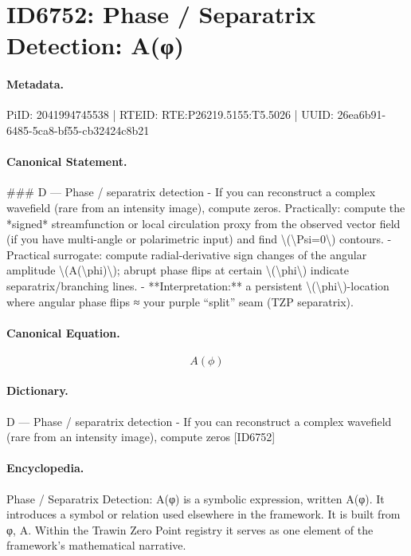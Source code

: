 \section*{ID6752: Phase / Separatrix Detection: A(φ)}
\paragraph{Metadata.}
PiID: 2041994745538 | RTEID: RTE:P26219.5155:T5.5026 | UUID: 26ea6b91-6485-5ca8-bf55-cb32424c8b21

\paragraph{Canonical Statement.}
\#\#\# D — Phase / separatrix detection - If you can reconstruct a complex wavefield (rare from an intensity image), compute zeros. Practically: compute the *signed* streamfunction or local circulation proxy from the observed vector field (if you have multi-angle or polarimetric input) and find \textbackslash{}(\textbackslash{}Psi=0\textbackslash{}) contours. - Practical surrogate: compute radial-derivative sign changes of the angular amplitude \textbackslash{}(A(\textbackslash{}phi)\textbackslash{}); abrupt phase flips at certain \textbackslash{}(\textbackslash{}phi\textbackslash{}) indicate separatrix/branching lines. - **Interpretation:** a persistent \textbackslash{}(\textbackslash{}phi\textbackslash{})-location where angular phase flips ≈ your purple “split” seam (TZP separatrix).

\paragraph{Canonical Equation.}
\[
A(\phi)
\]

\paragraph{Dictionary.}
D — Phase / separatrix detection - If you can reconstruct a complex wavefield (rare from an intensity image), compute zeros [ID6752]

\paragraph{Encyclopedia.}
Phase / Separatrix Detection: A(φ) is a symbolic expression, written A(φ). It introduces a symbol or relation used elsewhere in the framework. It is built from φ, A. Within the Trawin Zero Point registry it serves as one element of the framework's mathematical narrative.

